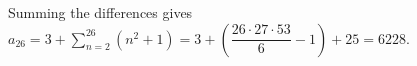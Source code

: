Summing the differences gives $a_{26}=3+\sum_{n=2}^{26}(n^2+1)=3+(\dfrac{26\cdot27\cdot53}{6}-1)+25=\boxed{6228}$.
